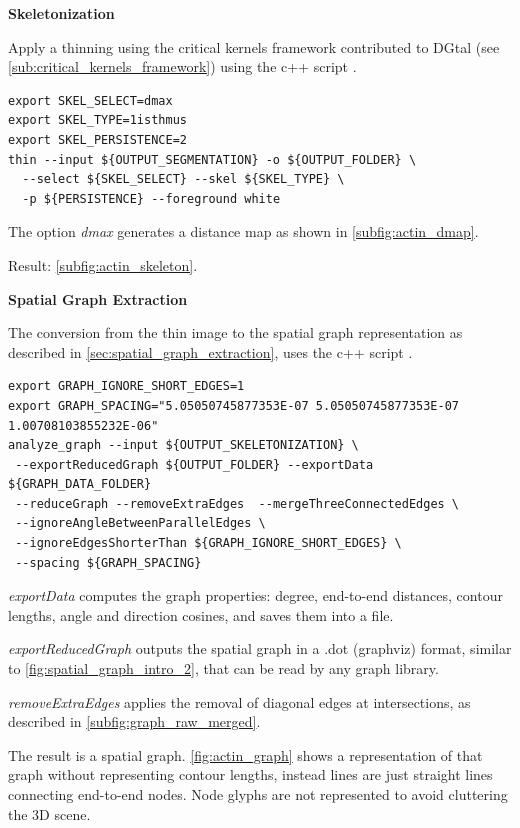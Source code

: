 \textbf{Skeletonization}

Apply a thinning using the critical kernels framework contributed to DGtal (see \autoref{sub:critical_kernels_framework})
using the c++ script   \cite{phcerdan_thin_2018}.

\begin{verbatim}
export SKEL_SELECT=dmax
export SKEL_TYPE=1isthmus
export SKEL_PERSISTENCE=2
thin --input ${OUTPUT_SEGMENTATION} -o ${OUTPUT_FOLDER} \
  --select ${SKEL_SELECT} --skel ${SKEL_TYPE} \
  -p ${PERSISTENCE} --foreground white
\end{verbatim}

The option \textit{dmax} generates a distance map as shown in \autoref{subfig:actin_dmap}.

Result: \autoref{subfig:actin_skeleton}.

\textbf{Spatial Graph Extraction}

The conversion from the thin image to the spatial graph representation as described in \autoref{sec:spatial_graph_extraction},
uses the c++ script   \cite{phcerdan_analyze_graph_2018}.

\begin{verbatim}
export GRAPH_IGNORE_SHORT_EDGES=1
export GRAPH_SPACING="5.05050745877353E-07 5.05050745877353E-07 1.00708103855232E-06"
analyze_graph --input ${OUTPUT_SKELETONIZATION} \
 --exportReducedGraph ${OUTPUT_FOLDER} --exportData ${GRAPH_DATA_FOLDER}
 --reduceGraph --removeExtraEdges  --mergeThreeConnectedEdges \
 --ignoreAngleBetweenParallelEdges \
 --ignoreEdgesShorterThan ${GRAPH_IGNORE_SHORT_EDGES} \
 --spacing ${GRAPH_SPACING}
\end{verbatim}

\textit{exportData} computes the graph properties: degree, end-to-end distances, contour lengths, angle and direction cosines, and saves them into a file.

\textit{exportReducedGraph} outputs the spatial graph in a .dot (graphviz) format, similar to \autoref{fig:spatial_graph_intro_2}, that can be read by any graph library.

\textit{removeExtraEdges} applies the removal of diagonal edges at intersections, as described in \autoref{subfig:graph_raw_merged}.

The result is a spatial graph. \autoref{fig:actin_graph} shows a representation of that graph without representing contour lengths, instead lines are just straight lines connecting end-to-end nodes. Node glyphs are not represented to avoid cluttering the 3D scene.


